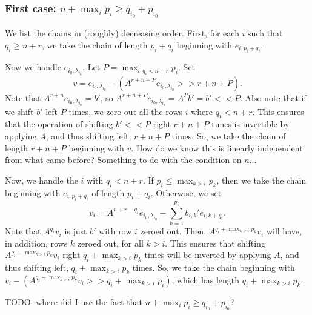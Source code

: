 \documentclass[12pt,psamsfonts]{article}
\begin{document}
\subsubsection{First case: \(n + \max_i p_i \geq q_{i_0} + p_{i_0}\)}
We list the chains in (roughly) decreasing order.
First, for each \(i\) such that \(q_i \geq n + r\), we take the chain of length \(p_i + q_i\) beginning with \(e_{i, p_i + q_i}\).
\par Now we handle \(e_{i_0, \lambda_{i_0}}\).
Let \(P = \max_{i : q_i < n + r} p_i\).
Set 
\[v = e_{i_0, \lambda_{i_0}} - (A^{r + n + P}e_{i_0, \lambda_{i_0}} >> r + n + P).\]
Note that \(A^{r + n} e_{i_0, \lambda_{i_0}} = b'\), so \(A^{r + n + P} e_{i_0, \lambda_{i_0}} = A^P b' = b' << P\).
Also note that if we shift \(b'\) left \(P\) times, we zero out all the rows \(i\) where \(q_i < n + r\).
This ensures that the operation of shifting \(b' << P\) right \(r + n + P\) times is invertible by applying \(A\), and thus shifting left, \(r + n + P\) times.
So, we take the chain of length \(r + n + P\) beginning with \(v\).
How do we know this is linearly independent from what came before?
Something to do with the condition on \(n\)...
\par Now, we handle the \(i\) with \(q_i < n + r\).
If \(p_i \leq \max_{k > i} p_k\), then we take the chain beginning with \(e_{i,p_i + q_i}\) of length \(p_i + q_i\).
Otherwise, we set 
\[v_i = A^{n + r - q_i} e_{i_0, \lambda_{i_0}} - \sum_{k = 1}^{p_i}b_{i,k}' e_{i,k + q_i}.\]
Note that \(A^{q_i} v_i\) is just \(b'\) with row \(i\) zeroed out.
Then, \(A^{q_i + \max_{k > i} p_k} v_i\) will have, in addition, rows \(k\) zeroed out, for all \(k > i\).
This ensures that shifting \(A^{q_i + \max_{k > i} p_k} v_i\) right \(q_i + \max_{k > i} p_k\) times will be inverted by applying \(A\), and thus shifting left, \(q_i + \max_{k > i} p_k\) times.
So, we take the chain beginning with \(v_i - (A^{q_i + \max_{k > i} p_k} v_i >> q_i + \max_{k > i} p_i)\), which has length \(q_i + \max_{k > i} p_k\).
\par TODO: where did I use the fact that \(n + \max_i p_i \geq q_{i_0} + p_{i_0}\)?
\end{document}

